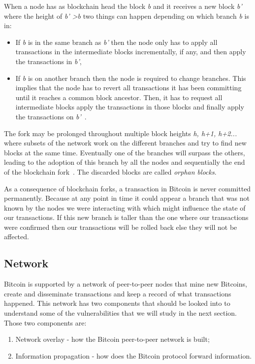 When a node has as blockchain head the block \textit{b} and it receives a new block \textit{b'} where the height of \textit{b' \textgreater b} two things can happen depending on which branch \textit{b} is in:
\begin{itemize}
\item If \textit{b} is in the same branch as \textit{b'} then the node only has to apply all transactions in the intermediate blocks incrementally, if any, and then apply the transactions in \textit{b'},
\item If \textit{b} is on another branch then the node is required to change branches. This implies that the node has to revert all transactions it has been committing until it reaches a common block ancestor. Then, it has to request all intermediate blocks apply the transactions in those blocks and finally apply the transactions on \textit{b'}~\cite{decker2013information}.
\end{itemize}

The fork may be prolonged throughout multiple block heights \textit{h, h+1, h+2...} where subsets of the network work on the different branches and try to find new blocks at the same time. Eventually one of the branches will surpass the others, leading to the adoption of this branch by all the nodes and sequentially the end of the blockchain fork~\cite{decker2013information}. The discarded blocks are called \textit{orphan blocks}.

As a consequence of blockchain forks, a transaction in Bitcoin is never committed permanently. Because at any point in time it could appear a branch that was not known by the nodes we were interacting with which might influence the state of our transactions. If this new branch is taller than the one where our transactions were confirmed then our transactions will be rolled back else they will not be affected.


\subsection{Network}
\label{sec:network}
Bitcoin is supported by a network of peer-to-peer nodes that mine new Bitcoins, create and disseminate transactions and keep a record of what transactions happened. This network has two components that should be looked into to understand some of the vulnerabilities that we will study in the next section. Those two components are:

\begin{enumerate}
	\item Network overlay - how the Bitcoin peer-to-peer network is built;
	\item Information propagation - how does the Bitcoin protocol forward information.
\end{enumerate}

